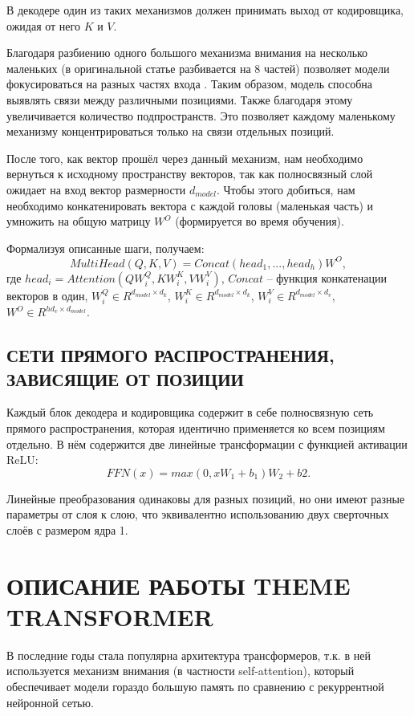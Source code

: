     В декодере один из таких механизмов должен принимать выход от кодировщика, ожидая от него $K$ и $V$. 
    
    Благодаря разбиению одного большого механизма внимания на несколько маленьких (в оригинальной статье разбивается на 8 частей) позволяет модели фокусироваться на разных частях входа \cite{attention}. Таким образом, модель способна выявлять связи между различными позициями.
    Также благодаря этому увеличивается количество подпространств. Это позволяет каждому маленькому механизму концентрироваться только на связи отдельных позиций.
    
    После того, как вектор прошёл через данный механизм, нам необходимо вернуться к исходному пространству векторов, так как полносвязный слой ожидает на вход вектор размерности $d_{model}$. Чтобы этого добиться, нам необходимо конкатенировать вектора с каждой головы (маленькая часть) и умножить на общую матрицу $W^O$ (формируется во время обучения).
    
    Формализуя описанные шаги, получаем:
    $$ MultiHead(Q, K, V) = Concat(head_1, ..., head_h)W^O, $$
    где $head_i = Attention(QW_{i}^Q, KW_{i}^K, VW_{i}^V)$, $Concat$ -- функция конкатенации векторов в один, $W_i^Q \in R^{d_{model} \times d_k}$, $W_i^K \in R^{d_{model} \times d_k}$, $W_i^V \in R^{d_{model} \times d_v}$, $W^O \in R^{hd_v \times d_{model}}$.
    
\subsection{СЕТИ ПРЯМОГО РАСПРОСТРАНЕНИЯ, ЗАВИСЯЩИЕ ОТ ПОЗИЦИИ}
    Каждый блок декодера и кодировщика содержит в себе полносвязную сеть прямого распространения, которая идентично применяется ко всем позициям отдельно. В нём содержится две линейные трансформации с функцией активации ReLU:
    $$ FFN(x) = max(0, xW_1 + b_1)W_2 + b2. $$
    
    Линейные преобразования одинаковы для разных позиций, но они имеют разные параметры от слоя к слою, что эквивалентно использованию двух сверточных слоёв с размером ядра 1. 
    

\section{ОПИСАНИЕ РАБОТЫ THEME TRANSFORMER}
    В последние годы стала популярна архитектура трансформеров, т.к. в ней используется механизм внимания (в частности self-attention), который обеспечивает модели гораздо большую память по сравнению с рекуррентной нейронной сетью.
    
